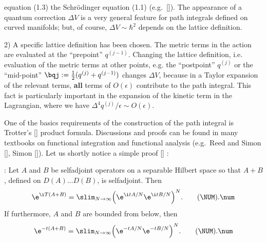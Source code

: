           equation (1.3) the Schr\"odinger equation (1.1)
          (e.g.\ [\DMa]). The appearance of a quantum correction
          $\Delta V$ is a very general feature for path integrals
          defined on curved manifolds; but, of course, $\Delta
          V\sim\hbar^2$ depends on the lattice definition.
\item{2)} A specific lattice definition has been chosen.
          The metric terms in the action are evaluated at the
          ``prepoint'' $q^{(j-1)}$.
          Changing the lattice definition, i.e. evaluation of the
          metric terms at other points, e.g. the ``postpoint''
          $q^{(j)}$ or the ``mid-point'' $\bqj:={1\over2}
          (q^{(j)}+q^{(j-1)})$ changes $\Delta V$, because in a Taylor
          expansion of the relevant terms, {\bf all} terms of
          $O(\epsilon)$ contribute to the path integral.
          This fact is particularly important in the expansion
          of the kinetic term in the Lagrangian, where we have
          $\Delta^4 q^{(j)}/\epsilon\sim O(\epsilon)$.


\noindent
One of the basics requirements of the construction of the
path integral is Trotter's [\TROT] product formula.
Discussions and proofs can be found in many textbooks on
functional integration and functional analysis
(e.g.\ Reed and Simon [\RS], Simon [\SIMON]).
Let us shortly notice a simple proof [\SIMON] :

:
Let $A$ and $B$ be selfadjoint operators on a separable Hilbert space
so that $A+B$, defined on $D(A)\dots D(B)$, is selfadjoint. Then
\plus
$$\e^{\i T(A+B)}=\slim_{N\to\infty}
  \Big(\e^{\i tA/N}\e^{\i tB/N}\Big)^N.
  \tag\NUM.\num$$
If furthermore, $A$ and $B$ are bounded from below, then
\plus
$$\e^{-t(A+B)}=\slim_{N\to\infty}\Big(\e^{-tA/N}\e^{-tB/N}\Big)^N.
  \tag\NUM.\num$$

